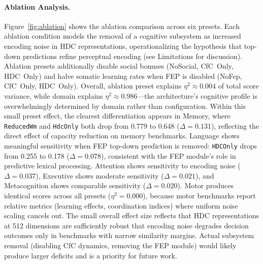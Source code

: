\documentclass[11pt,letterpaper]{article}
\begin{document}
\paragraph{Ablation Analysis.} Figure~\ref{fig:ablation} shows the ablation comparison across six presets. Each ablation condition models the removal of a cognitive subsystem as increased encoding noise in HDC representations, operationalizing the hypothesis that top-down predictions refine perceptual encoding (see Limitations for discussion). Ablation presets additionally disable social bonuses (NoSocial, CfC~Only, HDC~Only) and halve somatic learning rates when FEP is disabled (NoFep, CfC~Only, HDC~Only). Overall, ablation preset explains $\eta^2 \approx 0.004$ of total score variance, while domain explains $\eta^2 \approx 0.986$---the architecture's cognitive profile is overwhelmingly determined by domain rather than configuration. Within this small preset effect, the clearest differentiation appears in Memory, where \texttt{ReducedWm} and \texttt{HdcOnly} both drop from 0.779 to 0.648 ($\Delta = 0.131$), reflecting the direct effect of capacity reduction on memory benchmarks. Language shows meaningful sensitivity when FEP top-down prediction is removed: \texttt{HDCOnly} drops from 0.255 to 0.178 ($\Delta = 0.078$), consistent with the FEP module's role in predictive lexical processing. Attention shows sensitivity to encoding noise ($\Delta = 0.037$), Executive shows moderate sensitivity ($\Delta = 0.021$), and Metacognition shows comparable sensitivity ($\Delta = 0.020$). Motor produces identical scores across all presets ($\eta^2 = 0.000$), because motor benchmarks report relative metrics (learning effects, coordination indices) where uniform noise scaling cancels out. The small overall effect size reflects that HDC representations at 512 dimensions are sufficiently robust that encoding noise degrades decision outcomes only in benchmarks with narrow similarity margins. Actual subsystem removal (disabling CfC dynamics, removing the FEP module) would likely produce larger deficits and is a priority for future work.
\end{document}
